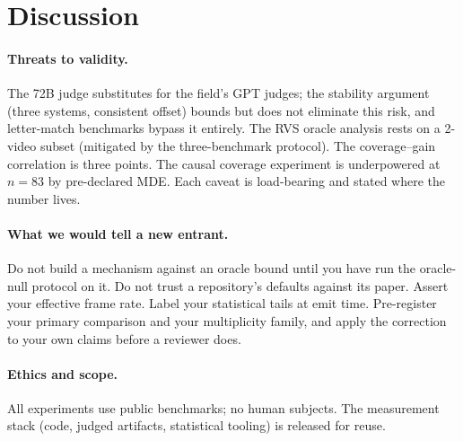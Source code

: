 \section{Discussion}
\label{sec:discussion}

\paragraph{Threats to validity.} The 72B judge substitutes for the field's GPT judges; the stability argument (three systems, consistent offset) bounds but does not eliminate this risk, and letter-match benchmarks bypass it entirely. The RVS oracle analysis rests on a 2-video subset (mitigated by the three-benchmark protocol). The coverage--gain correlation is three points. The causal coverage experiment is underpowered at $n{=}83$ by pre-declared MDE. Each caveat is load-bearing and stated where the number lives.

\paragraph{What we would tell a new entrant.} Do not build a mechanism against an oracle bound until you have run the oracle-null protocol on it. Do not trust a repository's defaults against its paper. Assert your effective frame rate. Label your statistical tails at emit time. Pre-register your primary comparison and your multiplicity family, and apply the correction to your own claims before a reviewer does.

\paragraph{Ethics and scope.} All experiments use public benchmarks; no human subjects. The measurement stack (code, judged artifacts, statistical tooling) is released for reuse.
